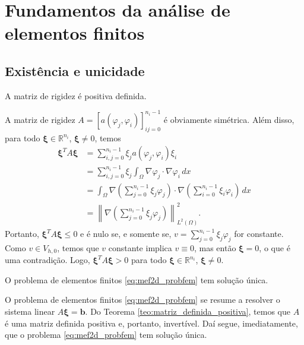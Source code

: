 \section{Fundamentos da análise de elementos finitos}

\subsection{Existência e unicidade}

\begin{teo}\label{teo:matriz_definida_positiva}
  A matriz de rigidez é positiva definida.
\end{teo}
\begin{dem}
  A matriz de rigidez $A = [a(\varphi_j,\varphi_i)]_{ij=0}^{n_i-1}$ é obviamente simétrica. Além disso, para todo $\pmb{\xi}\in\mathbb{R}^{n_i}$, $\pmb{\xi}\neq 0$, temos
  \begin{align}
    \pmb{\xi}^TA\pmb{\xi} &= \sum_{i,j=0}^{n_i-1} \xi_ja(\varphi_j,\varphi_i)\xi_i\\
    &= \sum_{i,j=0}^{n_i-1}\xi_j\int_\Omega \nabla \varphi_j\cdot\nabla\varphi_i\,dx\\
    &= \int_\Omega \nabla \left(\sum_{j=0}^{n_i-1}\xi_j\varphi_j\right)\cdot\nabla \left(\sum_{i=0}^{n_i-1}\xi_i\varphi_i\right)\,dx\\
    &= \left\|\nabla \left(\sum_{j=0}^{n_i-1}\xi_j\varphi_j\right) \right\|_{L^2(\Omega)}^2.
  \end{align}
  Portanto, $\pmb{\xi}^TA\pmb{\xi} \leq 0$ e é nulo se, e somente se, $v = \sum_{j=0}^{n_i-1}\xi_j\varphi_j$ for constante. Como $v\in V_{h,0}$, temos que $v$ constante implica $v\equiv 0$, mas então $\pmb{\xi}=0$, o que é uma contradição. Logo, $\pmb{\xi}^TA\pmb{\xi} > 0$ para todo $\pmb{\xi}\in\mathbb{R}^{n_i}$, $\pmb{\xi}\neq 0$.
\end{dem}

\begin{teo}
  O problema de elementos finitos \eqref{eq:mef2d_probfem} tem solução única.
\end{teo}
\begin{dem}
  O problema de elementos finitos \eqref{eq:mef2d_probfem} se resume a resolver o sistema linear $A\pmb{\xi} = \pmb{b}$. Do Teorema \ref{teo:matriz_definida_positiva}, temos que $A$ é uma matriz definida positiva e, portanto, invertível. Daí segue, imediatamente, que o problema \eqref{eq:mef2d_probfem} tem solução única.
\end{dem}

